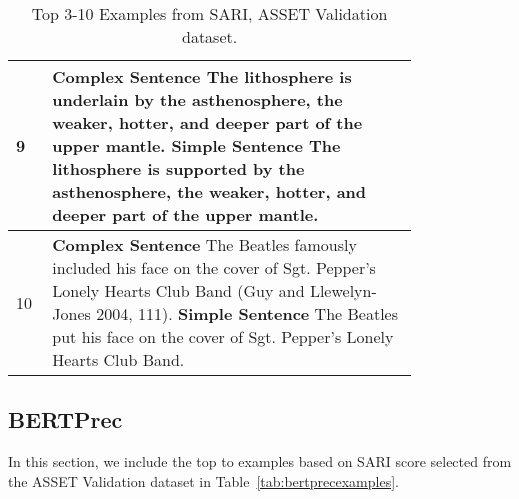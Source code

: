 \documentclass[11pt]{article}
\begin{document}
\begin{table*}[htbp]
\begin{tabular}{p{0.05\linewidth} p{0.75\linewidth}}
    9   & \textbf{Complex Sentence} The lithosphere is underlain by the asthenosphere, the weaker, hotter, and deeper part of the upper mantle.  \newline                                   \textbf{Simple Sentence} The lithosphere is supported by the asthenosphere, the weaker, hotter, and deeper part of the upper mantle.\\
    \midrule

    10   & \textbf{Complex Sentence} The Beatles famously included his face on the cover of Sgt. Pepper's Lonely Hearts Club Band (Guy and Llewelyn-Jones 2004, 111).
  \newline                                   \textbf{Simple Sentence} The Beatles put his face on the cover of Sgt. Pepper's Lonely Hearts Club Band.\\ 
    \bottomrule
    \end{tabular}
    \caption{Top 3-10 Examples from SARI, ASSET Validation dataset.} 
    \label{tab:3to10sari}
\end{table*}

\subsection{BERTPrec}
\label{ssec:top10bertprec}

In this section, we include the top  to  examples based on SARI score selected from the ASSET Validation dataset in Table~\ref{tab:bertprecexamples}.
\end{document}
